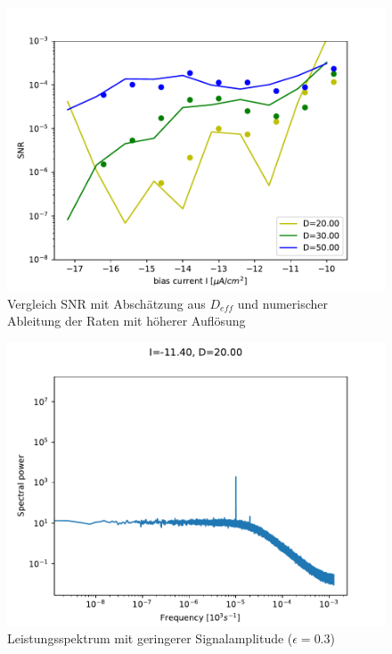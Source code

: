 \documentclass[12pt,a4paper]{article}
\begin{document}
\begin{figure}[H]
	\centering
	\includegraphics[scale=1]{snrangerealrinzelcomplong.pdf}\caption{Vergleich SNR mit Abschätzung aus $D_{eff}$ und numerischer Ableitung der Raten mit höherer Auflösung}
	\label{snrinzelcomplong}
\end{figure}
\begin{figure}[H]
	\centering
	\includegraphics[scale=1]{spekpoi4dd20.pdf}\caption{Leistungsspektrum mit geringerer Signalamplitude ($\epsilon=0.3$)}
	\label{spekpoi20}
\end{figure}
\end{document}
